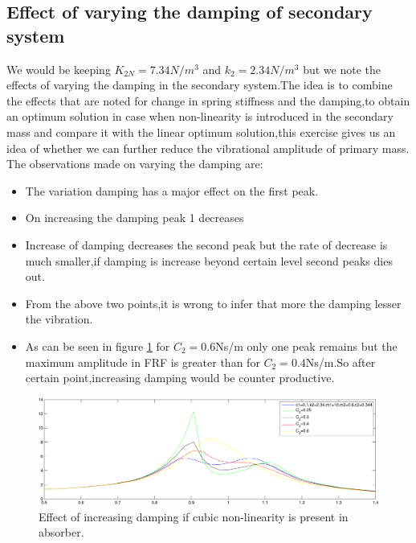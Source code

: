   \subsection{Effect of varying the damping of secondary system }
  We would be keeping $K_{2N}=7.34 N/m^3 $ and $k_2 =2.34 N/m^3$ but we note the effects of varying the damping in the secondary system.The idea is to combine the effects that are noted for change in spring stiffness and the damping,to obtain an optimum solution in case when non-linearity is introduced in the secondary mass and compare it with the linear optimum solution,this exercise gives us an idea of whether we can further reduce the vibrational amplitude of primary mass.
  The observations made on varying the damping are:
  \begin{itemize}
  \item The variation damping has a major effect on the first peak.
  \item On increasing the damping peak 1 decreases
  \item Increase of damping decreases the second peak but the rate of decrease is much smaller,if damping is increase beyond certain level second peaks dies out.
  \item From the above two points,it is wrong to infer that more the damping lesser the vibration.
  \item As can be seen in figure \ref{fig:non-linear secondary 3} for $C_2=0.6$Ns/m only one peak remains but the maximum amplitude in FRF is greater than for $C_2=0.4$Ns/m.So after certain point,increasing damping would be counter productive.
  \end{itemize}
  \begin{figure}[h!]
  \includegraphics[width=\textwidth,height=0.5\textwidth]{"figures/nonlinearity_secondary_3"}
  \caption{Effect of increasing damping if cubic non-linearity is present in absorber.}
  \label{fig:non-linear secondary 3}
  \end{figure}
